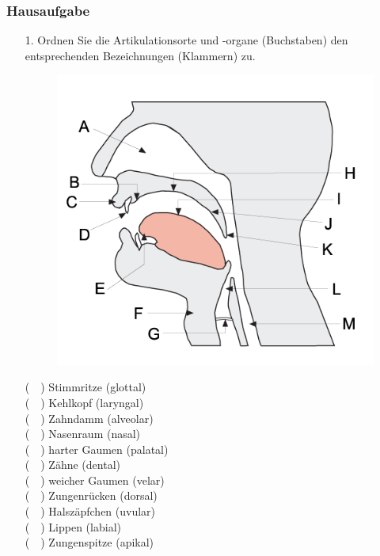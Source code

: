 \begin{frame}
\frametitle{Hausaufgabe}
\begin{itemize}
	\item[1.] Ordnen Sie die Artikulationsorte und -organe (Buchstaben) den entsprechenden Bezeichnungen (Klammern) zu.
	
\begin{minipage}{0.48\textwidth}
	\begin{figure}
		\centering
		\includegraphics[scale=0.33]{material/04phonoatonomy}
	\end{figure}
\end{minipage}
\hfill
\begin{minipage}{0.4\textwidth}
	
		(~~) Stimmritze (glottal)\\
		(~~) Kehlkopf (laryngal)\\
		(~~) Zahndamm (alveolar)\\
		(~~) Nasenraum (nasal)\\
		(~~) harter Gaumen (palatal)\\
		(~~) Zähne (dental)\\
		(~~) weicher Gaumen (velar)\\
		(~~) Zungenrücken (dorsal)\\
		(~~) Halszäpfchen (uvular)\\
		(~~) Lippen (labial)\\
		(~~) Zungenspitze (apikal)
\end{minipage}

\end{itemize}
\end{frame}


